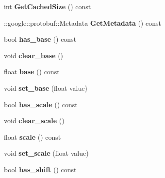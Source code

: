 \begin{DoxyCompactItemize}
int {\bfseries Get\+Cached\+Size} () const
\item 
\mbox{\label{classcaffe_1_1_log_parameter_ae2b9f4d75932517c385cbb2b54e479d6}} 
\+::google\+::protobuf\+::\+Metadata {\bfseries Get\+Metadata} () const
\item 
\mbox{\label{classcaffe_1_1_log_parameter_a0cfcf2c5dd6be15d94c943027a953ea4}} 
bool {\bfseries has\+\_\+base} () const
\item 
\mbox{\label{classcaffe_1_1_log_parameter_a4cf9d70130b38bb19f67d87404a182d6}} 
void {\bfseries clear\+\_\+base} ()
\item 
\mbox{\label{classcaffe_1_1_log_parameter_a2575b7118ba5db174463e67c38f87804}} 
float {\bfseries base} () const
\item 
\mbox{\label{classcaffe_1_1_log_parameter_af6bbef52b478012eea78cf4b08bad7e2}} 
void {\bfseries set\+\_\+base} (float value)
\item 
\mbox{\label{classcaffe_1_1_log_parameter_a4e772552a8e48fa740b593e7f9fd080b}} 
bool {\bfseries has\+\_\+scale} () const
\item 
\mbox{\label{classcaffe_1_1_log_parameter_a153d39814b8e9ddd5f3e34d08d660432}} 
void {\bfseries clear\+\_\+scale} ()
\item 
\mbox{\label{classcaffe_1_1_log_parameter_af9891363294aa8330aa691331c31c615}} 
float {\bfseries scale} () const
\item 
\mbox{\label{classcaffe_1_1_log_parameter_a851f017c1baaa396e2bdb1f4c17f3ef0}} 
void {\bfseries set\+\_\+scale} (float value)
\item 
\mbox{\label{classcaffe_1_1_log_parameter_a4b7f522520d71821ed48ce5e9f449e2f}} 
bool {\bfseries has\+\_\+shift} () const
\item 
\mbox{\label{classcaffe_1_1_log_parameter_aeb2aae1873248ced2b445d2a3c0d6d25}} 

\end{DoxyCompactItemize}

